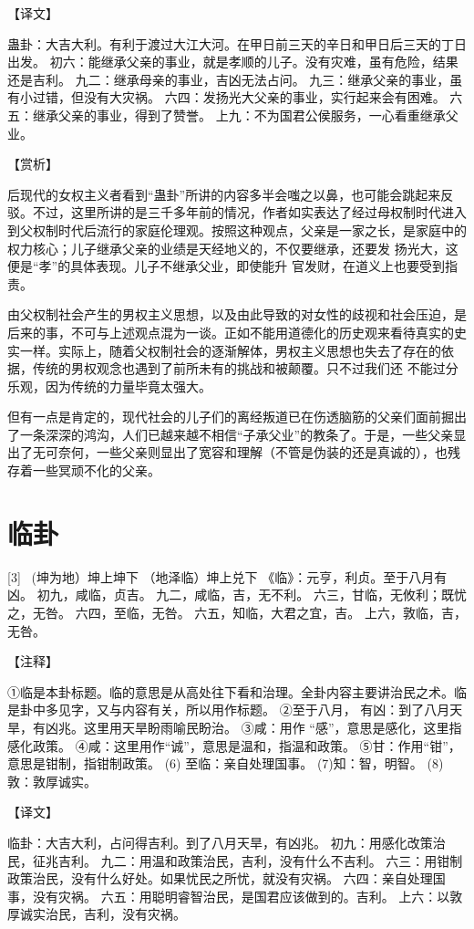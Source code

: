 \documentclass[12pt,UTF8]{ctexbook}
\begin{document}
【译文】

蛊卦：大吉大利。有利于渡过大江大河。在甲日前三天的辛日和甲日后三天的丁日出发。
初六：能继承父亲的事业，就是孝顺的儿子。没有灾难，虽有危险，结果还是吉利。
九二：继承母亲的事业，吉凶无法占问。
九三：继承父亲的事业，虽有小过错，但没有大灾祸。
六四：发扬光大父亲的事业，实行起来会有困难。
六五：继承父亲的事业，得到了赞誉。
上九：不为国君公侯服务，一心看重继承父业。

【赏析】

后现代的女权主义者看到“蛊卦”所讲的内容多半会嗤之以鼻，也可能会跳起来反驳。不过，这里所讲的是三千多年前的情况，作者如实表达了经过母权制时代进入到父权制时代后流行的家庭伦理观。按照这种观点，父亲是一家之长，是家庭中的权力核心；儿子继承父亲的业绩是天经地义的，不仅要继承，还要发 扬光大，这便是“孝”的具体表现。儿子不继承父业，即使能升 官发财，在道义上也要受到指责。

由父权制社会产生的男权主义思想，以及由此导致的对女性的歧视和社会压迫，是后来的事，不可与上述观点混为一谈。正如不能用道德化的历史观来看待真实的史实一样。实际上，随着父权制社会的逐渐解体，男权主义思想也失去了存在的依据，传统的男权观念也遇到了前所未有的挑战和被颠覆。只不过我们还 不能过分乐观，因为传统的力量毕竟太强大。

但有一点是肯定的，现代社会的儿子们的离经叛道已在伤透脑筋的父亲们面前掘出了一条深深的鸿沟，人们已越来越不相信“子承父业”的教条了。于是，一些父亲显出了无可奈何，一些父亲则显出了宽容和理解（不管是伪装的还是真诚的），也残存着一些冥顽不化的父亲。

\chapter{临卦}
[3] \ (坤为地）坤上坤下
（地泽临）坤上兑下
《临》：元亨，利贞。至于八月有凶。
初九，咸临，贞吉。
九二，咸临，吉，无不利。
六三，甘临，无攸利；既忧之，无咎。
六四，至临，无咎。
六五，知临，大君之宜，吉。
上六，敦临，吉，无咎。

【注释】

①临是本卦标题。临的意思是从高处往下看和治理。全卦内容主要讲治民之术。临是卦中多见字，又与内容有关，所以用作标题。
②至于八月， 有凶：到了八月天旱，有凶兆。这里用天旱盼雨喻民盼治。
③咸：用作 “感”，意思是感化，这里指感化政策。
④咸：这里用作“诚”，意思是温和，指温和政策。
⑤甘：作用“钳”，意思是钳制，指钳制政策。
(6) 至临：亲自处理国事。
(7)知：智，明智。
(8)敦：敦厚诚实。

【译文】

临卦：大吉大利，占问得吉利。到了八月天旱，有凶兆。
初九：用感化改策治民，征兆吉利。
九二：用温和政策治民，吉利，没有什么不吉利。
六三：用钳制政策治民，没有什么好处。如果忧民之所忧，就没有灾祸。
六四：亲自处理国事，没有灾祸。
六五：用聪明睿智治民，是国君应该做到的。吉利。
上六：以敦厚诚实治民，吉利，没有灾祸。
\end{document}
